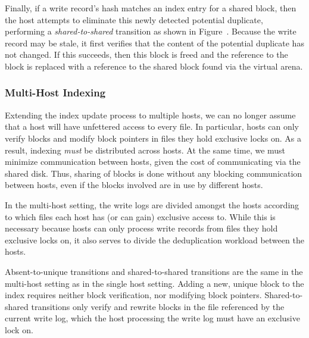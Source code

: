 Finally, if a write record's hash matches an index entry for a
shared block, then the host attempts to eliminate this newly detected
potential duplicate, performing a \emph{shared-to-shared} transition
as shown in
Figure~.  Because
the write record may be stale, it first verifies that the content of
the potential duplicate has not changed.  If this succeeds, then this
block is freed and the reference to the block is replaced with a
reference to the shared block found via the virtual arena.

\subsubsection{Multi-Host Indexing}

Extending the index update process to multiple hosts, we can no longer
assume that a host will have unfettered access to every file.  In
particular, hosts can only verify blocks and modify block pointers in
files they hold exclusive locks on.  As a result, indexing \emph{must}
be distributed across hosts.  At the same time, we must minimize
communication between hosts, given the cost of communicating via the
shared disk.  Thus, sharing of blocks is done without
any blocking communication between hosts, even if the blocks involved
are in use by different hosts.

In the multi-host setting, the write logs are divided amongst the
hosts according to which files each host has (or can gain) exclusive
access to.  While this is necessary because hosts can only process
write records from files they hold exclusive locks on, it also serves
to divide the deduplication workload between the hosts.

Absent-to-unique transitions and shared-to-shared transitions are
the same in the multi-host setting as in the single host setting.
Adding a new, unique block to the
index requires neither block verification, nor modifying block
pointers.  Shared-to-shared transitions only verify and rewrite blocks
in the file referenced by the current write log, which the host
processing the write log must have an exclusive lock on.

